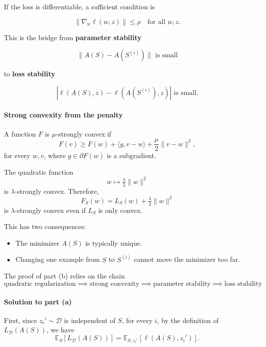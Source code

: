 \documentclass[11pt,a4paper]{article}
\theoremstyle{definition}
\begin{document}
If the loss is differentiable, a sufficient condition is

\begin{equation*}
\|\nabla_w \ell(w, z)\| \leq \rho \quad \text{for all } w, z.
\end{equation*}

This is the bridge from \textbf{parameter stability}

\begin{equation*}
\|A(S) - A(S^{(i)})\| \text{ is small}
\end{equation*}

to \textbf{loss stability}

\begin{equation*}
|\ell(A(S), z) - \ell(A(S^{(i)}), z)| \text{ is small.}
\end{equation*}

\paragraph{Strong convexity from the penalty}

A function $F$ is $\mu$-strongly convex if
\[
F(v) \geq F(w) + \langle g, v - w \rangle + \frac{\mu}{2}\|v - w\|^2,
\]
for every $w, v$, where $g \in \partial F(w)$ is a subgradient.

The quadratic function
\[
w \mapsto \tfrac{\lambda}{2}\|w\|^2
\]
is $\lambda$-strongly convex. Therefore,
\[
F_S(w) = L_S(w) + \tfrac{\lambda}{2}\|w\|^2
\]
is $\lambda$-strongly convex even if $L_S$ is only convex.

This has two consequences:
\begin{itemize}
    \item The minimizer $A(S)$ is typically unique.
    \item Changing one example from $S$ to $S^{(i)}$ cannot move the minimizer too far.
\end{itemize}

The proof of part (b) relies on the chain
\[
\text{quadratic regularization} \implies \text{strong convexity} \implies \text{parameter stability} \implies \text{loss stability}
\]


\paragraph{Solution to part (a)}

First, since $z_i' \sim \mathcal{D}$ is independent of $S$, for every $i$, by the definition of $L_{\mathcal{D}}(A(S))$, we have
\begin{equation}
\mathbb{E}_S[L_{\mathcal{D}}(A(S))] = \mathbb{E}_{S, z_i'}[\ell(A(S), z_i')].
\label{eq:expected-pop}
\end{equation}
\end{document}

